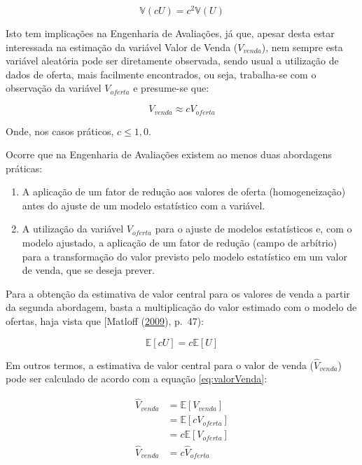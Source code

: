 \documentclass{article}
\begin{document}
\begin{equation}
\label{eq:varprop}
\mathbb{V}(cU) = c^2\mathbb{V}(U)
\end{equation}

Isto tem implicações na Engenharia de Avaliações, já que, apesar desta
estar interessada na estimação da variável Valor de Venda
(\(V_{venda}\)), nem sempre esta variável aleatória pode ser diretamente
observada, sendo usual a utilização de dados de oferta, mais facilmente
encontrados, ou seja, trabalha-se com o observação da variável
\(V_{oferta}\) e presume-se que:

\begin{equation}
\label{eq:varVenda}
V_{venda} \approx cV_{oferta}
\end{equation}

Onde, nos casos práticos, \(c \leq 1,0\).

Ocorre que na Engenharia de Avaliações existem ao menos duas abordagens
práticas:

\begin{enumerate}
\def\labelenumi{\arabic{enumi}.}
\item
  A aplicação de um fator de redução aos valores de oferta
  (homogeneização) antes do ajuste de um modelo estatístico com a
  variável.
\item
  A utilização da variável \(V_{oferta}\) para o ajuste de modelos
  estatísticos e, com o modelo ajustado, a aplicação de um fator de
  redução (campo de arbítrio) para a transformação do valor previsto
  pelo modelo estatístico em um valor de venda, que se deseja prever.
\end{enumerate}

Para a obtenção da estimativa de valor central para os valores de venda
a partir da segunda abordagem, basta a multiplicação do valor estimado
com o modelo de ofertas, haja vista que {[}Matloff
(\protect\hyperlink{ref-matloff2009}{2009}), p.~47):

\begin{equation}
\label{eq:Eprop}
\mathbb{E}[cU] = c\mathbb{E}[U]
\end{equation}

Em outros termos, a estimativa de valor central para o valor de venda
(\(\hat V_{venda}\)) pode ser calculado de acordo com a equação
\ref{eq:valorVenda}:

\begin{align}
\hat V_{venda} &= \mathbb{E}[V_{venda}] \nonumber \\ 
&= \mathbb{E}[cV_{oferta}] \nonumber \\
&= c\mathbb{E}[V_{oferta}] \nonumber \\
\hat V_{venda} &= c \hat V_{oferta} \label{eq:valorVenda}
\end{align}
\end{document}
